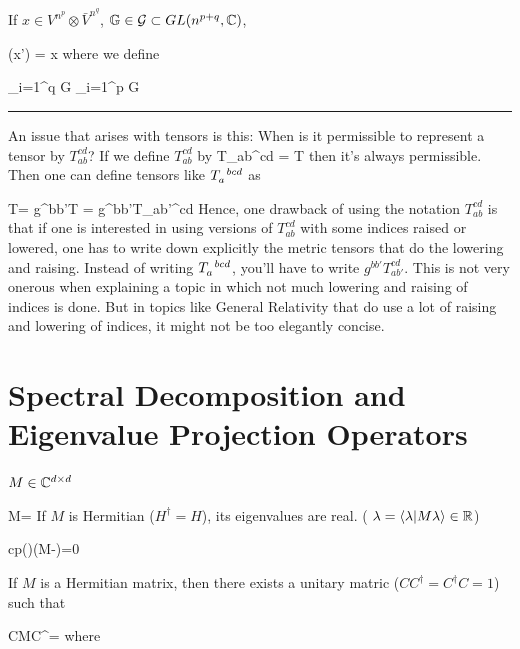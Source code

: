 If $x\in V^{n^p}\otimes \bar{V}^{n^q}$, ${ \mathbb{G}}\in {\cal G}\subset GL(n^{p+q}, { \mathbb{C}})$,

\beq
(x')
=
\GG{}
x
\eeq
where we define

\beq
\GG{}
\eqdef
\prod_{i=1}^q
G
\prod_{i=1}^p
G
\eeq


\hrule
An issue that arises with tensors is this:
When is it permissible to represent 
a tensor by $T_{ab}^{cd}$?
If we define
$T_{ab}^{cd}$  by
\beq
T_{ab}^{cd} = T
\eeq
then it's always permissible.
Then one can define
tensors like
$T\indices{_a^b^c^d}$
as 

\beq
T=
g^{bb'}T
=
g^{bb'}T_{ab'}^{cd}
\eeq
Hence, one drawback of
using the notation
$T_{ab}^{cd}$
is that if one is interested 
in using versions of
$T_{ab}^{cd}$ with
some indices raised or 
lowered, one has to 
write down explicitly the metric tensors 
that do the lowering and
raising.
Instead of writing
$T\indices{_a^b^c^d}$,
you'll have to write
$g^{bb'}T_{ab'}^{cd}$.
This is not very onerous when 
explaining a topic
in which not much
lowering and raising of indices is
done. But in topics like
General Relativity that do
use a lot of raising and lowering of indices, it might not be 
too elegantly concise.







\section{Spectral Decomposition and Eigenvalue Projection Operators}
\label{ch-spectral-decom}

$M\in { \mathbb{C}}^{d\times d }$

\beq
M=\lam {}
\eeq
If $M$ is Hermitian ($H^\dagger=H$), its eigenvalues are real. ( $\lambda =
\left\langle\lambda|M\lambda\right\rangle\in{ \mathbb{R}}$)


\beq
cp(\lam)\eqdef \det(M-\lam)=0
\eeq

If $M$ is a Hermitian  matrix, then there exists
a unitary matric ($CC^\dagger = C^\dagger C =1$)
such that

\beq
CMC^\dagger=
\eeq
where

